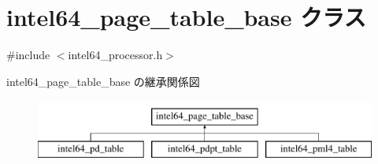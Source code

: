 \hypertarget{classintel64__page__table__base}{}\section{intel64\+\_\+page\+\_\+table\+\_\+base クラス}
\label{classintel64__page__table__base}


{\ttfamily \#include $<$intel64\+\_\+processor.\+h$>$}

intel64\+\_\+page\+\_\+table\+\_\+base の継承関係図\begin{figure}[H]
\begin{center}
\leavevmode
\includegraphics[height=2.000000cm]{classintel64__page__table__base}
\end{center}
\end{figure}
